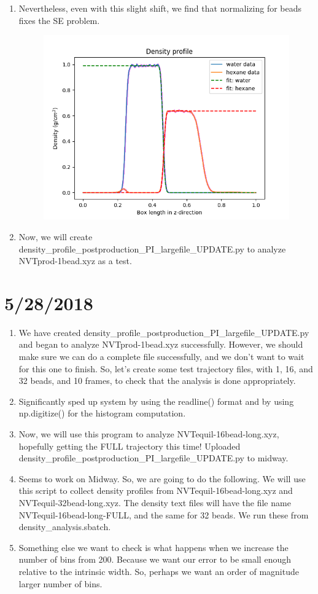 \documentclass[12pt,reqno]{amsart}
\numberwithin{equation}{section}
\begin{document}
\begin{enumerate}
\item Nevertheless, even with this slight shift, we find that normalizing for beads fixes the SE problem.  
\begin{figure}[H]
\centering
\includegraphics[scale=0.6]{interface_density_profile_beadnorm}
\end{figure}
\item Now, we will create density\_profile\_postproduction\_PI\_largefile\_UPDATE.py to analyze NVTprod-1bead.xyz as a test.  
\end{enumerate}

\section{5/28/2018}
\begin{enumerate}
\item We have created density\_profile\_postproduction\_PI\_largefile\_UPDATE.py and began to analyze NVTprod-1bead.xyz successfully.  However, we should make sure we can do a complete file successfully, and we don't want to wait for this one to finish.  So, let's create some test trajectory files, with 1, 16, and 32 beads, and 10 frames, to check that the analysis is done appropriately.  
\item Significantly sped up system by using the readline() format and by using np.digitize() for the histogram computation.
\item Now, we will use this program to analyze NVTequil-16bead-long.xyz, hopefully getting the FULL trajectory this time!  Uploaded density\_profile\_postproduction\_PI\_largefile\_UPDATE.py to midway.
\item Seems to work on Midway.  So, we are going to do the following.  We will use this script to collect density profiles from NVTequil-16bead-long.xyz and NVTequil-32bead-long.xyz.  The density text files will have the file name NVTequil-16bead-long-FULL, and the same for 32 beads.  We run these from density\_analysis.sbatch.    
\item Something else we want to check is what happens when we increase the number of bins from 200.  Because we want our error to be small enough relative to the intrinsic width. So, perhaps we want an order of magnitude larger number of bins.  
\end{enumerate}
\end{document}
